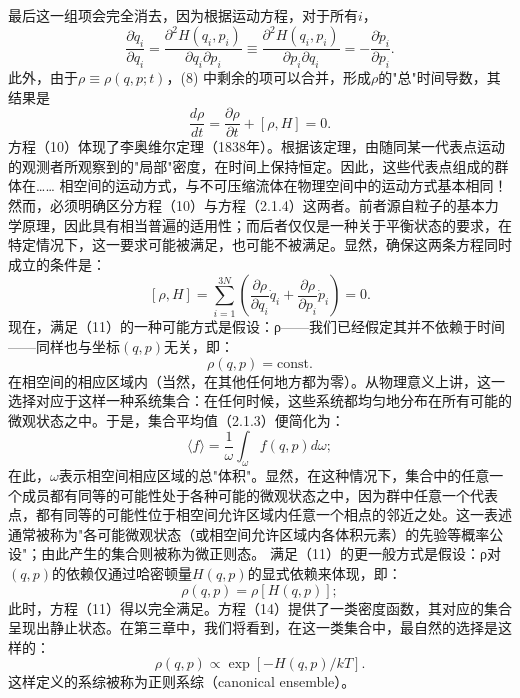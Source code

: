 最后这一组项会完全消去，因为根据运动方程，对于所有\(i\)，
\begin{equation}\tag{2.2.8}\label{eq:2.2.8}
\frac { \partial \dot { q } _ { i } } { \partial q _ { i } } = \frac { \partial ^{2} H ( q _ { i } , p _ { i } ) } { \partial q _ { i } \partial p _ { i } } \equiv \frac { \partial ^{2} H ( q _ { i } , p _ { i } ) } { \partial p _ { i } \partial q _ { i } } = - \frac { \partial \dot { p } _ { i } } { \partial p _ { i } } .
\end{equation}
此外，由于\(\rho \equiv \rho(q,p;t)\)，(8) 中剩余的项可以合并，形成\(\rho\)的"总"时间导数，其结果是
\begin{equation}\tag{2.2.9}\label{eq:2.2.9}
\frac { d \rho } { d t } = \frac { \partial \rho } { \partial t } + [ \rho , H ] = 0 .
\end{equation}
方程（10）体现了李奥维尔定理（1838年）。根据该定理，由随同某一代表点运动的观测者所观察到的"局部"密度，在时间上保持恒定。因此，这些代表点组成的群体在\ldots\ldots{}
相空间的运动方式，与不可压缩流体在物理空间中的运动方式基本相同！
然而，必须明确区分方程（10）与方程（2.1.4）这两者。前者源自粒子的基本力学原理，因此具有相当普遍的适用性；而后者仅仅是一种关于平衡状态的要求，在特定情况下，这一要求可能被满足，也可能不被满足。显然，确保这两条方程同时成立的条件是：
\begin{equation}\tag{2.2.10}\label{eq:2.2.10}
[ \rho , H ] = \sum _ { i = 1 } ^{3 N} \left( \frac { \partial \rho } { \partial q _ { i } } \dot { q } _ { i } + \frac { \partial \rho } { \partial p _ { i } } \dot { p } _ { i } \right) = 0 .
\end{equation}
现在，满足（11）的一种可能方式是假设：ρ——我们已经假定其并不依赖于时间——同样也与坐标\((q,p)\)无关，即：
\begin{equation}\tag{2.2.11}\label{eq:2.2.11}
\rho ( q , p ) = \mathrm { c o n s t . }
\end{equation}
在相空间的相应区域内（当然，在其他任何地方都为零）。从物理意义上讲，这一选择对应于这样一种系统集合：在任何时候，这些系统都均匀地分布在所有可能的微观状态之中。于是，集合平均值（2.1.3）便简化为：
\begin{equation}\tag{2.2.12}\label{eq:2.2.12}
\langle f \rangle = \frac { 1 } { \omega } \int _ { \omega } f ( q , p ) d \omega ;
\end{equation}
在此，\(\omega\)表示相空间相应区域的总"体积"。显然，在这种情况下，集合中的任意一个成员都有同等的可能性处于各种可能的微观状态之中，因为群中任意一个代表点，都有同等的可能性位于相空间允许区域内任意一个相点的邻近之处。这一表述通常被称为"各可能微观状态（或相空间允许区域内各体积元素）的先验等概率公设"；由此产生的集合则被称为微正则态。
满足（11）的更一般方式是假设：ρ对\((q,p)\)的依赖仅通过哈密顿量\(H(q,p)\)的显式依赖来体现，即：
\begin{equation}\tag{2.2.13}\label{eq:2.2.13}
\rho ( q , p ) = \rho [ H ( q , p ) ] ;
\end{equation}
此时，方程（11）得以完全满足。方程（14）提供了一类密度函数，其对应的集合呈现出静止状态。在第三章中，我们将看到，在这一类集合中，最自然的选择是这样的：
\begin{equation}\tag{2.2.14}\label{eq:2.2.14}
\rho ( q , p ) \propto \exp [ - H ( q , p ) / k T ] .
\end{equation}
这样定义的系综被称为正则系综（canonical ensemble）。

